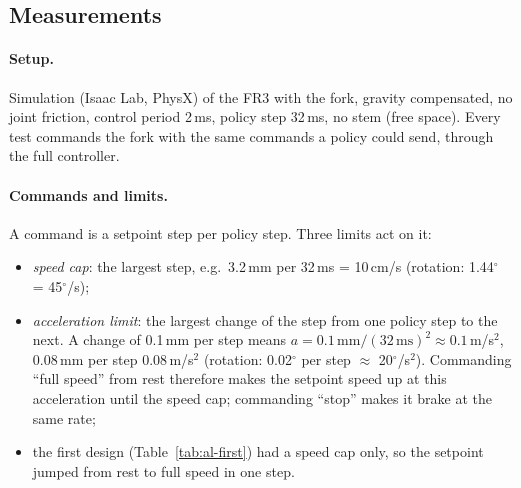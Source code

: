 \subsection{Measurements}
\label{sec:al-measurements}

\paragraph{Setup.} Simulation (Isaac Lab, PhysX) of the FR3 with the fork, gravity compensated, no joint friction,
control period 2\,ms, policy step 32\,ms, no stem (free space). Every test commands the fork with the same commands
a policy could send, through the full controller.

\paragraph{Commands and limits.} A command is a setpoint step per policy step. Three limits act on it:
\begin{itemize}
  \item \emph{speed cap}: the largest step, e.g.\ 3.2\,mm per 32\,ms = 10\,cm/s (rotation: 1.44$^\circ$ = 45$^\circ$/s);
  \item \emph{acceleration limit}: the largest change of the step from one policy step to the next. A change of
        0.1\,mm per step means $a = 0.1\,\text{mm}/(32\,\text{ms})^2 \approx 0.1$\,m/s$^2$, 0.08\,mm per step
        0.08\,m/s$^2$ (rotation: 0.02$^\circ$ per step $\approx$ 20$^\circ$/s$^2$). Commanding ``full speed'' from rest therefore makes the setpoint speed up at
        this acceleration until the speed cap; commanding ``stop'' makes it brake at the same rate;
  \item the first design (Table~\ref{tab:al-first}) had a speed cap only, so the setpoint jumped from rest to full
        speed in one step.
\end{itemize}

